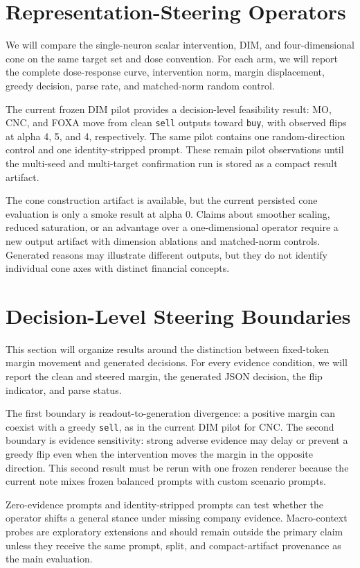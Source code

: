 \documentclass[11pt]{article}
\begin{document}
\section{Representation-Steering Operators}

We will compare the single-neuron scalar intervention, DIM, and four-dimensional cone on the same
target set and dose convention. For each arm, we will report the complete dose-response curve,
intervention norm, margin displacement, greedy decision, parse rate, and matched-norm random control.

The current frozen DIM pilot provides a decision-level feasibility result: MO, CNC, and FOXA move
from clean \texttt{sell} outputs toward \texttt{buy}, with observed flips at alpha 4, 5, and 4,
respectively. The same pilot contains one random-direction control and one identity-stripped prompt.
These remain pilot observations until the multi-seed and multi-target confirmation run is stored as
a compact result artifact.

The cone construction artifact is available, but the current persisted cone evaluation is only a
smoke result at alpha 0. Claims about smoother scaling, reduced saturation, or an advantage over a
one-dimensional operator require a new output artifact with dimension ablations and matched-norm
controls. Generated reasons may illustrate different outputs, but they do not identify individual
cone axes with distinct financial concepts.

\section{Decision-Level Steering Boundaries}

This section will organize results around the distinction between fixed-token margin movement and
generated decisions. For every evidence condition, we will report the clean and steered margin, the
generated JSON decision, the flip indicator, and parse status.

The first boundary is readout-to-generation divergence: a positive margin can coexist with a greedy
\texttt{sell}, as in the current DIM pilot for CNC. The second boundary is evidence sensitivity:
strong adverse evidence may delay or prevent a greedy flip even when the intervention moves the
margin in the opposite direction. This second result must be rerun with one frozen renderer because
the current note mixes frozen balanced prompts with custom scenario prompts.

Zero-evidence prompts and identity-stripped prompts can test whether the operator shifts a general
stance under missing company evidence. Macro-context probes are exploratory extensions and should
remain outside the primary claim unless they receive the same prompt, split, and compact-artifact
provenance as the main evaluation.
\end{document}
